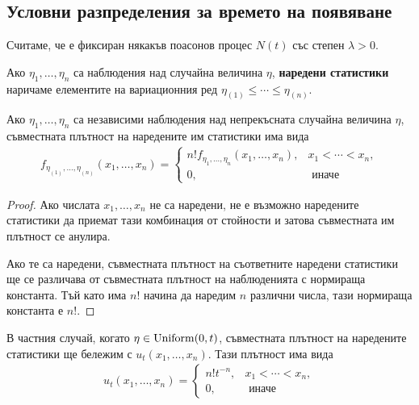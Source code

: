 \documentclass[numbers=endperiod, bibliography=totocnumbered]{scrartcl}
\begin{document}
\subsection{Условни разпределения за времето на появяване}

Считаме, че е фиксиран някакъв поасонов процес \( N(t) \) със степен \( \lambda > 0 \).

\begin{definition}
  Ако \( \eta_1, \ldots, \eta_n \) са наблюдения над случайна величина \( \eta \), \textbf{наредени статистики} наричаме елементите на вариационния ред \( \eta_{(1)} \leq \cdots \leq \eta_{(n)} \).
\end{definition}

\begin{proposition}
  Ако \( \eta_1, \ldots, \eta_n \) са независими наблюдения над непрекъсната случайна величина \( \eta \), съвместната плътност на наредените им статистики има вида
  \begin{align*}
    f_{\eta_{(1)}, \ldots, \eta_{(n)}} (x_1, \ldots, x_n)
    =
    \begin{cases}
      n! f_{\eta_{1}, \ldots, \eta_{n}} (x_1, \ldots, x_n), &x_1 < \cdots < x_n, \\
      0, &\text{ иначе}
    \end{cases}
  \end{align*}
\end{proposition}
\begin{proof}
  Ако числата \( x_1, \ldots, x_n \) не са наредени, не е възможно наредените статистики да приемат тази комбинация от стойности и затова съвместната им плътност се анулира.

  Ако те са наредени, съвместната плътност на съответните наредени статистики ще се различава от съвместната плътност на наблюденията с нормираща константа. Тъй като има \( n \)! начина да наредим \( n \) различни числа, тази нормираща константа е \( n \)!.
\end{proof}

\begin{note}
  В частния случай, когато \( \eta \in \operatorname{Uniform}(0, t) \), съвместната плътност на наредените статистики ще бележим с \( u_t(x_1, \ldots, x_n) \). Тази плътност има вида
  \begin{align*}
    u_t(x_1, \ldots, x_n)
    =
    \begin{cases}
      n! t^{-n}, &x_1 < \cdots < x_n, \\
      0, &\text{ иначе}
    \end{cases}
  \end{align*}
\end{note}
\end{document}
